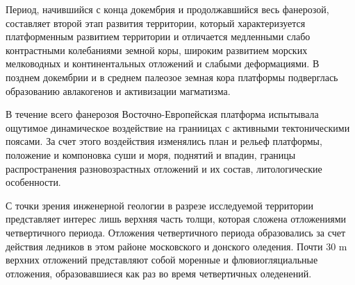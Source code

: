 Период, начившийся с конца докембрия и продолжавшийся весь фанерозой, 
составляет второй этап развития 
территории, который характеризуется платформенным развитием территории и отличается 
медленными слабо контрастными колебаниями земной коры, широким развитием морских
мелководных и континентальных отложений и слабыми деформациями. В позднем докембрии 
и в среднем палеозое земная кора платформы подверглась образованию авлакогенов 
и активизации магматизма. 

В течение всего фанерозоя Восточно-Европейская платформа испытывала 
ощутимое динамическое воздействие на граниицах с активными тектоническими
поясами.
За счет этого воздействия изменялись план и рельеф платформы, 
положение и компоновка суши и моря, поднятий и впадин, границы распространения 
разновозрастных отложений и их состав, литологические особенности.

С точки зрения инженерной геологии в разрезе исследуемой территории 
представляет интерес лишь верхняя часть толщи, которая сложена 
отложениями четвертичного периода. Отложения четвертичного периода 
образовались за счет действия ледников в этом районе 
московского и донского оледения. Почти 30 \si{\meter} верхних 
отложений представляют собой моренные и флювиогляциальные отложения, 
образовавшиеся как раз  во время четвертичных оледенений.